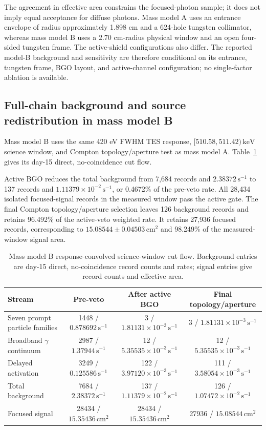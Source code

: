 \documentclass[11pt]{article}
\newcommand{\keV}{\ensuremath{\,\mathrm{keV}}}
\newcommand{\cps}{\ensuremath{\,\mathrm{s^{-1}}}}
\begin{document}
The agreement in effective area constrains the focused-photon sample; it does not imply equal acceptance for diffuse photons. Mass model A uses an entrance envelope of radius approximately 1.898 cm and a 624-hole tungsten collimator, whereas mass model B uses a 2.70 cm-radius physical window and an open four-sided tungsten frame. The active-shield configurations also differ. The reported model-B background and sensitivity are therefore conditional on its entrance, tungsten frame, BGO layout, and active-channel configuration; no single-factor ablation is available.

\FloatBarrier

\subsection{Full-chain background and source redistribution in mass model B}
\label{subsec:optimized_fullchain}

Mass model B uses the same 420 eV FWHM TES response, $[510.58,511.42)\keV$ science window, and Compton topology/aperture test as mass model A. Table~\ref{tab:optimized_cutflow} gives its day-15 direct, no-coincidence cut flow.

Active BGO reduces the total background from 7,684 records and $2.38372\cps$ to 137 records and $1.11379\times10^{-2}\cps$, or 0.4672\% of the pre-veto rate. All 28,434 isolated focused-signal records in the measured window pass the active gate. The final Compton topology/aperture selection leaves 126 background records and retains 96.492\% of the active-veto weighted rate. It retains 27,936 focused records, corresponding to $15.08544\pm0.04503\,\mathrm{cm^2}$ and 98.249\% of the measured-window signal area.

\begin{table}[H]
\centering
\caption{Mass model B response-convolved science-window cut flow. Background entries are day-15 direct, no-coincidence record counts and rates; signal entries give record counts and effective area.}
\label{tab:optimized_cutflow}
\footnotesize
\begin{tabular}{lccc}
\toprule
Stream & Pre-veto & After active BGO & Final topology/aperture \\
\midrule
Seven prompt particle families & 1448 / $0.878692\cps$ & 3 / $1.81131\times10^{-3}\cps$ & 3 / $1.81131\times10^{-3}\cps$ \\
Broadband $\gamma$ continuum & 2987 / $1.37944\cps$ & 12 / $5.35535\times10^{-3}\cps$ & 12 / $5.35535\times10^{-3}\cps$ \\
Delayed activation & 3249 / $0.125586\cps$ & 122 / $3.97120\times10^{-3}\cps$ & 111 / $3.58054\times10^{-3}\cps$ \\
Total background & 7684 / $2.38372\cps$ & 137 / $1.11379\times10^{-2}\cps$ & 126 / $1.07472\times10^{-2}\cps$ \\
Focused signal & 28434 / $15.35436\,\mathrm{cm^2}$ & 28434 / $15.35436\,\mathrm{cm^2}$ & 27936 / $15.08544\,\mathrm{cm^2}$ \\
\bottomrule
\end{tabular}
\end{table}
\end{document}
